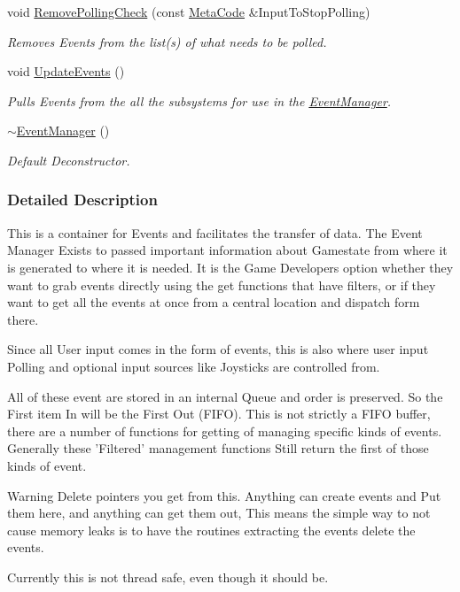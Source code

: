 \begin{DoxyCompactItemize}
void \hyperlink{classMezzanine_1_1EventManager_a446cab99c7c67b42e28753cda14d79a4}{RemovePollingCheck} (const \hyperlink{classMezzanine_1_1MetaCode}{MetaCode} \&InputToStopPolling)
\begin{DoxyCompactList}\small\item\em Removes Events from the list(s) of what needs to be polled. \item\end{DoxyCompactList}\item 
void \hyperlink{classMezzanine_1_1EventManager_a07119a541a60a515e2108c79cf6e3aac}{UpdateEvents} ()
\begin{DoxyCompactList}\small\item\em Pulls Events from the all the subsystems for use in the \hyperlink{classMezzanine_1_1EventManager}{EventManager}. \item\end{DoxyCompactList}\item 
\hyperlink{classMezzanine_1_1EventManager_a39b9e0f783c2ab0d39f5574a7a106141}{$\sim$EventManager} ()
\begin{DoxyCompactList}\small\item\em Default Deconstructor. \item\end{DoxyCompactList}\end{DoxyCompactItemize}


\subsubsection{Detailed Description}
This is a container for Events and facilitates the transfer of data. The Event Manager Exists to passed important information about Gamestate from where it is generated to where it is needed. It is the Game Developers option whether they want to grab events directly using the get functions that have filters, or if they want to get all the events at once from a central location and dispatch form there. \par
 Since all User input comes in the form of events, this is also where user input Polling and optional input sources like Joysticks are controlled from. \par
 All of these event are stored in an internal Queue and order is preserved. So the First item In will be the First Out (FIFO). This is not strictly a FIFO buffer, there are a number of functions for getting of managing specific kinds of events. Generally these 'Filtered' management functions Still return the first of those kinds of event. \begin{DoxyWarning}{Warning}
Delete pointers you get from this. Anything can create events and Put them here, and anything can get them out, This means the simple way to not cause memory leaks is to have the routines extracting the events delete the events. 

Currently this is not thread safe, even though it should be. 
\end{DoxyWarning}


